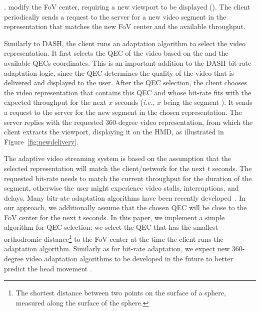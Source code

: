 .
 modify the FoV center, requiring a new viewport
to be displayed (). The client periodically sends a request
to the server for a new video segment in the representation that
matches  the new FoV center and the available throughput.

 Similarly to \ac{DASH}, the client runs
an adaptation algorithm to select the video representation. It first
selects the \ac{QEC} of the video based on the  and
the available \acp{QEC} coordinates. This is an important addition to
the \ac{DASH} bit-rate adaptation logic, since the \ac{QEC} determines
the quality of the video that is delivered and displayed to the user.
After the \ac{QEC} selection, the client chooses the video
representation that contains this \ac{QEC} and whose bit-rate fits
with the expected throughput for the next $x$ seconds (\textit{i.e.},
$x$ being the segment ). It sends a request to the server
for the new segment in the chosen representation. The server replies
with the requested 360-degree video representation, from which the
client extracts the viewport, displaying it on the \ac{HMD}, as
illustrated in Figure~\ref{fig:newdelivery}.

The adaptive video streaming system is based on the assumption that
the selected representation will match the client/network
 for the next $t$ seconds. The requested bit-rate
needs to match the current throughput for the duration of the segment,
otherwise the user might experience video stalls, interruptions, and
delays. Many bitr-ate adaptation algorithms have been recently
developed~\cite{tian,probe_li_2014,miller,zou,liu}. In our approach,
we additionally assume that the chosen \ac{QEC} will be close to the
\ac{FoV} center for the next $t$ seconds. In this paper, we implement
a simple algorithm for \ac{QEC} selection: we select the \ac{QEC} that
has the smallest orthodromic distance\footnote{The shortest distance
between two points on the surface of a sphere, measured along the
surface of the sphere. } to the FoV center at the time the client runs
the adaptation algorithm. Similarly as for bit-rate adaptation, we
expect new 360-degree video adaptation algorithms to be developed in
the future to better predict the head movement .

